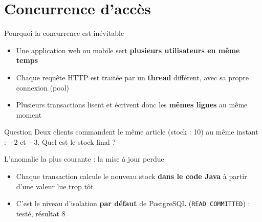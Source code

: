 \documentclass[aspectratio=169,10pt]{beamer}
\begin{document}
\section{Concurrence d'acc\`es}

\begin{frame}{Pourquoi la concurrence est in\'evitable}
  \begin{itemize}
    \item Une application web ou mobile sert \textbf{plusieurs utilisateurs en m\^eme temps}
    \item Chaque requ\^ete HTTP est trait\'ee par un \textbf{thread} diff\'erent, avec sa propre connexion (pool)
    \item Plusieurs transactions lisent et \'ecrivent donc les \textbf{m\^emes lignes} au m\^eme moment
  \end{itemize}
  \vspace{2mm}
  \begin{alertblock}{Question}
    Deux clients commandent le m\^eme article (stock : 10) au m\^eme instant : $-2$ et $-3$.
    Quel est le stock final ? 
  \end{alertblock}
\end{frame}

\begin{frame}{L'anomalie la plus courante : la mise \`a jour perdue}
  \begin{center}
  \end{center}
  \begin{itemize}
    \item Chaque transaction calcule le nouveau stock \textbf{dans le code Java} \`a partir d'une valeur lue trop t\^ot
    \item C'est le niveau d'isolation \textbf{par d\'efaut} de PostgreSQL (\texttt{READ COMMITTED}) : \alert{test\'e, r\'esultat 8}
  \end{itemize}
\end{frame}
\end{document}
